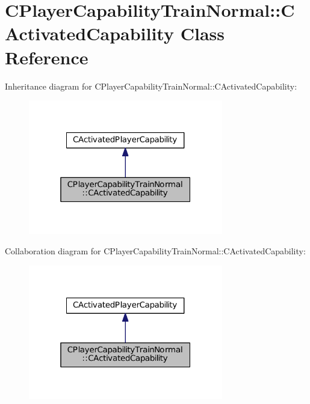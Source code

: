 \hypertarget{classCPlayerCapabilityTrainNormal_1_1CActivatedCapability}{}\section{C\+Player\+Capability\+Train\+Normal\+:\+:C\+Activated\+Capability Class Reference}
\label{classCPlayerCapabilityTrainNormal_1_1CActivatedCapability}


Inheritance diagram for C\+Player\+Capability\+Train\+Normal\+:\+:C\+Activated\+Capability\+:
\nopagebreak
\begin{figure}[H]
\begin{center}
\leavevmode
\includegraphics[width=241pt]{classCPlayerCapabilityTrainNormal_1_1CActivatedCapability__inherit__graph}
\end{center}
\end{figure}


Collaboration diagram for C\+Player\+Capability\+Train\+Normal\+:\+:C\+Activated\+Capability\+:
\nopagebreak
\begin{figure}[H]
\begin{center}
\leavevmode
\includegraphics[width=241pt]{classCPlayerCapabilityTrainNormal_1_1CActivatedCapability__coll__graph}
\end{center}
\end{figure}
